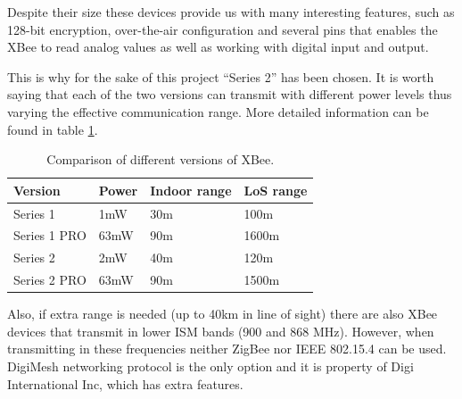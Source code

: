 Despite their size these devices provide us with many interesting features, such as 128-bit encryption, over-the-air configuration and several pins that enables the XBee to read analog values as well as working with digital input and output\citep{xbeedatasheet}.

This is why for the sake of this project ``Series 2'' has been chosen. It is worth saying that each of the two versions can transmit with different power levels thus varying the effective communication range\citep{faludi2010building}. More detailed information can be found in table \ref{tab:xbee_versions}.

\begin{table}[ht] 
\centering
\begin{tabular}{l l l l}
    Version     & Power                 & Indoor range     & LoS range\footnotemark[7]\\
\hline
Series 1        & 1mW                   & 30m              & 100m\\
Series 1 PRO    & 63mW\footnotemark[8]  & 90m              & 1600m\\
Series 2        & 2mW                   & 40m              & 120m\\
Series 2 PRO    & 63mW\footnotemark[8]  & 90m              & 1500m\\
\end{tabular}
\caption{Comparison of different versions of XBee\textregistered.}
\label{tab:xbee_versions}
\end{table}


Also, if extra range is needed (up to 40km in line of sight) there are also XBee\textregistered{} devices that transmit in lower ISM bands (900 and 868 MHz). However, when transmitting in these frequencies neither ZigBee nor IEEE 802.15.4 can be used. DigiMesh\texttrademark{} networking protocol is the only option and it is property of Digi International Inc, which has extra features.



